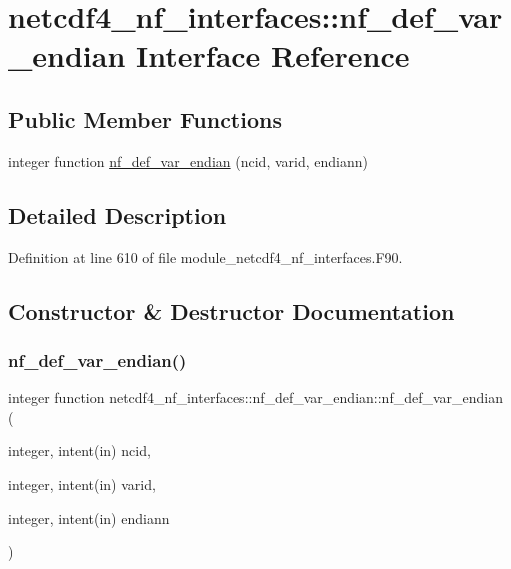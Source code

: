 \hypertarget{interfacenetcdf4__nf__interfaces_1_1nf__def__var__endian}{}\section{netcdf4\+\_\+nf\+\_\+interfaces\+:\+:nf\+\_\+def\+\_\+var\+\_\+endian Interface Reference}
\label{interfacenetcdf4__nf__interfaces_1_1nf__def__var__endian}
\subsection*{Public Member Functions}
\begin{DoxyCompactItemize}
\item 
integer function \hyperlink{interfacenetcdf4__nf__interfaces_1_1nf__def__var__endian_a028efabb79e1cf5a53e8ce910587d52e}{nf\+\_\+def\+\_\+var\+\_\+endian} (ncid, varid, endiann)
\end{DoxyCompactItemize}


\subsection{Detailed Description}


Definition at line 610 of file module\+\_\+netcdf4\+\_\+nf\+\_\+interfaces.\+F90.



\subsection{Constructor \& Destructor Documentation}
\mbox{\label{interfacenetcdf4__nf__interfaces_1_1nf__def__var__endian_a028efabb79e1cf5a53e8ce910587d52e}} 
\subsubsection{\texorpdfstring{nf\+\_\+def\+\_\+var\+\_\+endian()}{nf\_def\_var\_endian()}}
{\footnotesize\ttfamily integer function netcdf4\+\_\+nf\+\_\+interfaces\+::nf\+\_\+def\+\_\+var\+\_\+endian\+::nf\+\_\+def\+\_\+var\+\_\+endian (\begin{DoxyParamCaption}\item[{integer, intent(in)}]{ncid,  }\item[{integer, intent(in)}]{varid,  }\item[{integer, intent(in)}]{endiann }\end{DoxyParamCaption})}



